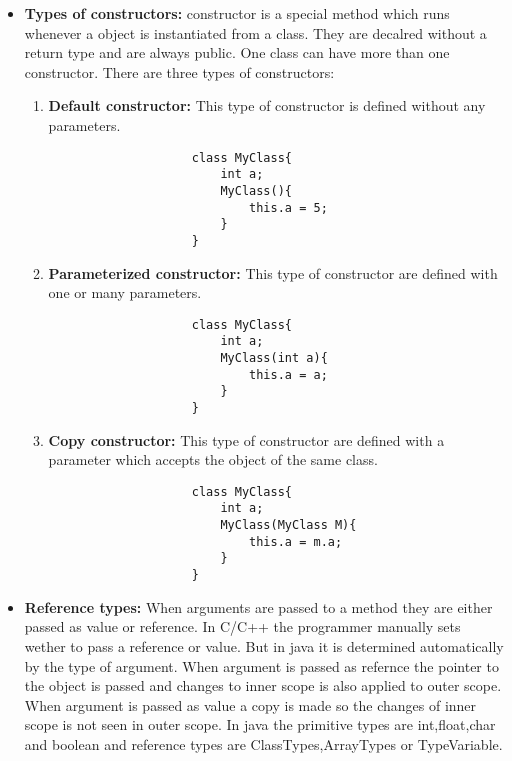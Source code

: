 \documentclass{book}
\begin{document}
\begin{itemize}
    \item{\textbf{Types of constructors:}}
        constructor is a special method which runs whenever a object is instantiated from a class. They are decalred without a return type and are always public.
        One class can have more than one constructor. There are three types of constructors:
            \begin{enumerate}
                \item{\textbf{Default constructor:}} This type of constructor is defined without any parameters.
                \begin{verbatim}
                    class MyClass{
                        int a;
                        MyClass(){
                            this.a = 5;
                        }
                    }
                \end{verbatim}
                \item{\textbf{Parameterized constructor:}} This type of constructor are defined with one or many parameters.
                \begin{verbatim}
                    class MyClass{
                        int a;
                        MyClass(int a){
                            this.a = a;
                        }
                    }
                \end{verbatim}
                \item{\textbf{Copy constructor:}} This type of constructor are defined with a parameter which accepts the object of the same class.
                \begin{verbatim}
                    class MyClass{
                        int a;
                        MyClass(MyClass M){
                            this.a = m.a;
                        }
                    }
                \end{verbatim}
            \end{enumerate}
    \item{\textbf{Reference types:}}
        When arguments are passed to a method they are either passed as value or reference. In C/C++ the programmer manually sets wether to pass a reference or value.
        But in java it is determined automatically by the type of argument. When argument is passed as refernce the pointer to the object is passed and changes to inner scope is also applied to outer scope.
        When argument is passed as value a copy is made so the changes of inner scope is not seen in outer scope. In java the primitive types are int,float,char and boolean and reference types are ClassTypes,ArrayTypes or TypeVariable. 

\end{itemize}
\end{document}
